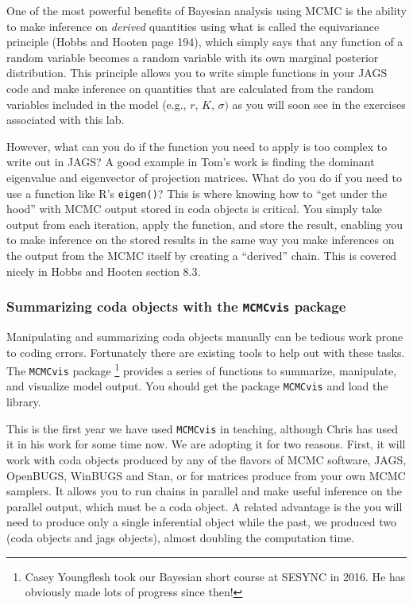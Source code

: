 \documentclass[12pt,english]{article}
\begin{document}
\begin{mdframed}[frametitle={Box 1: Using R to calculate derived quantities from MCMC objects}, backgroundcolor=black!10]
One of the most powerful benefits of Bayesian analysis using MCMC is the ability to make inference on \emph{derived} quantities using what is called the equivariance principle (Hobbs and Hooten \citeyearpar{hobbs2015bayesian} page 194), which simply says that any function of a random variable becomes a random variable with its own marginal posterior distribution. This principle allows you to write simple functions in your JAGS code and make inference on quantities that are calculated from the random variables included in the model (e.g., $r$, $K$, $\sigma)$ as you will soon see in the exercises associated with this lab. 

\noindent However, what can you do if the function you need to apply is too complex to write out in JAGS? A good example in Tom's work is finding the dominant eigenvalue and eigenvector of projection matrices. What do you do if you need to use a function like R's \texttt{eigen()}? This is where knowing how to ``get under the hood'' with MCMC output stored in coda objects is critical. You simply take output from each iteration, apply the function, and store the result, enabling you to make inference on the stored results in the same way you make inferences on the output from the MCMC itself by creating a ``derived'' chain. This is covered nicely in Hobbs and Hooten \citeyearpar{hobbs2015bayesian} section 8.3.

\end{mdframed}  

\subsubsection{Summarizing coda objects with the \texttt{MCMCvis} package}

Manipulating and summarizing coda objects manually can be tedious work prone to coding errors. Fortunately there are existing tools to help out with these tasks. The \texttt{MCMCvis} package \citep{youngflesh2018}\footnote{Casey Youngflesh took our Bayesian short course at SESYNC in 2016. He has obviously made lots of progress since then!} provides a series of functions to summarize, manipulate, and visualize model output.  You should get the package  \texttt{MCMCvis} and load the library.

This is the first year we have used \texttt{MCMCvis} in teaching, although Chris has used it in his work for some time now.  We are adopting it for two reasons.  First, it will work with coda objects produced by any of the flavors of MCMC software, JAGS, OpenBUGS, WinBUGS and Stan, or for matrices produce from your own MCMC samplers. It allows you to run chains in parallel and make useful inference on the parallel output, which must be a coda object.  A related advantage is the you will need to produce only a single inferential object while the past, we produced two (coda objects and jags objects), almost doubling the computation time.
\end{document}
